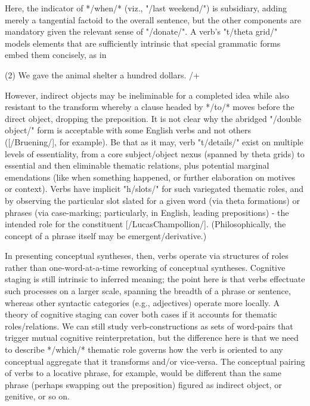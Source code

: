 Here, the indicator of */when/* (viz., "/last weekend/") is subsidiary, adding merely a tangential 
factoid to the overall sentence, but the other components are 
mandatory given the relevant sense of "/donate/".  A verb's 
"t/theta grid/" models elements that are sufficiently 
intrinsic that special grammatic forms embed them concisely, 
as in 

(2)  We gave the animal shelter a hundred dollars.
/+

However, indirect objects may be ineliminable for a completed idea while 
also resistant to the transform whereby a clause headed 
by */to/* moves before the direct object, dropping the preposition.
It is not clear why the abridged "/double object/" form is acceptable 
with some English verbs and not others ([/Bruening/], for example).  Be that as it may, 
verb "t/details/" exist on multiple levels of essentiality, 
from a core subject/object nexus (spanned by theta grids) to 
essential and then eliminable thematic relations, plus potential marginal 
emendations (like when something happened, or further elaboration 
on motives or context).  Verbs have implicit 
"h/slots/" for such variegated thematic roles, and by observing 
the particular slot slated for a given word (via theta formations) 
or phrases (via case-marking; particularly, in English, leading 
prepositions) -%
the intended role for the constituent [/LucasChampollion/].  (Philosophically, 
the concept of a phrase itself may be emergent/derivative.)

In presenting conceptual syntheses, then, verbs operate via structures 
of roles rather than one-word-at-a-time reworking of conceptual syntheses.  
Cognitive staging is still intrinsic to inferred meaning; the point 
here is that verbs effectuate such processes on a larger scale, 
spanning the breadth of a phrase or sentence, whereas other 
syntactic categories (e.g., adjectives) operate more locally.  
A theory of cognitive staging can cover both cases if it 
accounts for thematic roles/relations.
We can still study verb-constructions as sets of word-pairs 
that trigger mutual cognitive reinterpretation, but the difference 
here is that we need to describe */which/* thematic 
role governs how the verb is oriented to any conceptual aggregate that 
it transforms and/or vice-versa.  The conceptual pairing of verbs to a 
locative phrase, for example, would be different than the 
same phrase (perhaps swapping out the preposition) figured 
as indirect object, or genitive, or so on.

